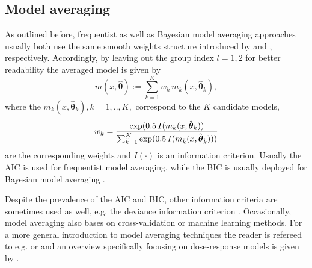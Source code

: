 {\subsection{Model averaging} \label{sec:MA:MA}
As outlined before, frequentist as well as Bayesian model averaging approaches usually both use the same smooth weights structure introduced by \citet{Buckland1997} and \citet{Wasserman2000}, respectively. 
Accordingly, by leaving out the group index $l=1,2$ for better readability 
the averaged model is given by 
\begin{equation} \label{eq:MA}
    m(x, \hat{\boldsymbol{\theta}}) := \sum_{k=1}^K w_{k} \, m_{k}(x, \hat{\boldsymbol{\theta}}_k),
\end{equation}
where the $m_k(x, \hat{\boldsymbol{\theta}}_{k}), k =1,..,K,$ correspond to the  $K$ candidate models,
\begin{equation} \label{eq:weights}
    w_{k} = \frac{\exp(0.5 \, I(m_k(x, \hat{\boldsymbol{\theta}}_{k}))}{\sum_{\Tilde{k}=1}^K \exp(0.5 \, I( m_{\Tilde{k}}(x, \hat{\boldsymbol{\theta}}_{\Tilde{k}})))}
\end{equation}
are the corresponding weights and $I(\cdot)$ is an information criterion. Usually the AIC is used for frequentist model averaging, while the BIC is usually deployed for Bayesian model averaging \citep{Schorning2016}.  

Despite the prevalence of the AIC and BIC, other information criteria are sometimes used as well, e.g. the deviance information criterion 
\citep[see, e.g.,][]{Price2011}.
Occasionally, model averaging also bases on cross-validation or machine learning methods. 
For a more general introduction to model averaging techniques the reader is refereed to e.g. \citet{Fletcher_2018} or \citet{Claeskens_2008} and an overview specifically focusing on dose-response models is given by \citet{Schorning2016}.  
}
